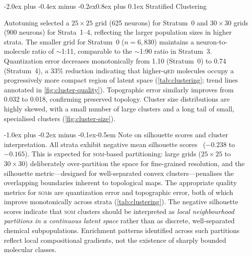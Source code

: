 \documentclass[10pt,a4paper,twocolumn]{article}
\makeatletter
\providecommand{\qed}{}
\let\qed\relax
\newcommand{\som}{\textsc{som}}
\newcommand{\qedscore}{\textsc{qed}}
\let\qed\qedscore
\renewcommand\subsection{\@startsection{subsection}{2}{\z@}%
  {-2.0ex plus -0.4ex minus -0.2ex}{0.8ex plus 0.1ex}%
  {\normalfont\large\bfseries}}
\renewcommand\paragraph{\@startsection{paragraph}{4}{\z@}%
  {-1.0ex plus -0.2ex minus -0.1ex}{-0.5em}%
  {\normalfont\normalsize\bfseries}}
\makeatother
\begin{document}
\subsection{Stratified Clustering}
\label{sec:clustering-results}

Autotuning selected a $25\times25$ grid (625 neurons) for Stratum~0 and $30\times30$ grids (900 neurons) for Strata~1--4, reflecting the larger population sizes in higher strata. The smaller grid for Stratum~0 ($n = 6{,}830$) maintains a neuron-to-molecule ratio of $\sim$1:11, comparable to the $\sim$1:90 ratio in Stratum~3. Quantization error decreases monotonically from 1.10 (Stratum~0) to 0.74 (Stratum~4), a 33\% reduction indicating that higher-\qed{} molecules occupy a progressively more compact region of latent space (\cref{tab:clustering}; trend lines annotated in \cref{fig:cluster-quality}). Topographic error similarly improves from 0.032 to 0.018, confirming preserved topology. Cluster size distributions are highly skewed, with a small number of large clusters and a long tail of small, specialised clusters (\cref{fig:cluster-size}).

\paragraph{Note on silhouette scores and cluster interpretation.} All strata exhibit negative mean silhouette scores~\cite{rousseeuw1987} ($-0.238$ to $-0.165$). This is expected for \som{}-based partitioning: large grids ($25\!\times\!25$ to $30\!\times\!30$) deliberately over-partition the space for fine-grained resolution, and the silhouette metric---designed for well-separated convex clusters---penalises the overlapping boundaries inherent to topological maps. The appropriate quality metrics for \som{}s are quantization error and topographic error, both of which improve monotonically across strata (\cref{tab:clustering}). The negative silhouette scores indicate that \som{} clusters should be interpreted as \emph{local neighbourhood partitions in a continuous latent space} rather than as discrete, well-separated chemical subpopulations. Enrichment patterns identified across such partitions reflect local compositional gradients, not the existence of sharply bounded molecular classes.
\end{document}
